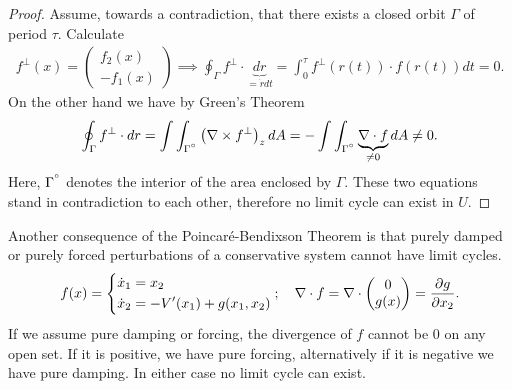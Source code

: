 \begin{proof}
	Assume, towards a contradiction, that there exists a closed orbit $\Gamma$ of period $\tau$. Calculate 
	\begin{align}
	f^{\perp}(x) =
	\begin{pmatrix}
		f_2(x) \\ -f_1(x)
	\end{pmatrix}
	\implies \oint_{\Gamma }f^{\perp}\cdot \underbrace{dr}_{=\dot{r}dt}
	=\int_{0}^{\tau} f^{\perp}(r(t)) \cdot f(r(t)) dt = 0.
	\end{align}
On the other hand we have by Green's Theorem
\begin{align}
	\oint_{\Gamma }f^{\perp}\cdot dr = \int \int_{\Gamma^{\degree}} \left(\nabla \times f^{\perp}\right)_{z}dA = - \int \int_{\Gamma^{\degree}} \underbrace{\nabla \cdot f}_{\neq 0}dA \neq 0.
\end{align}
Here, $\Gamma^{\degree}$ denotes the interior of the area enclosed by $\Gamma$. These two equations stand in contradiction to each other, therefore no limit cycle can exist in $U$. 
\end{proof}
\begin{remark}[]
	Another consequence of the Poincaré-Bendixson Theorem is that purely damped or purely forced perturbations of a conservative system cannot have limit cycles. 
	\begin{align}
		f(x) =
		\begin{dcases}
			\dot{x}_1 = x_2 \\
			\dot{x}_2 = -V'(x_1) + g(x_1, x_2)
		\end{dcases}
		;\quad 
		\nabla \cdot f = \nabla \cdot
		\begin{pmatrix}
			0 \\ g(x)
		\end{pmatrix}
		=\frac{\partial g}{\partial x_2}.
	\end{align}
	If we assume pure damping or forcing, the divergence of $f$ cannot be 0 on any open set. If it is positive, we have pure forcing, alternatively if it is negative we have pure damping. In either case no limit cycle can exist.	
\end{remark}

